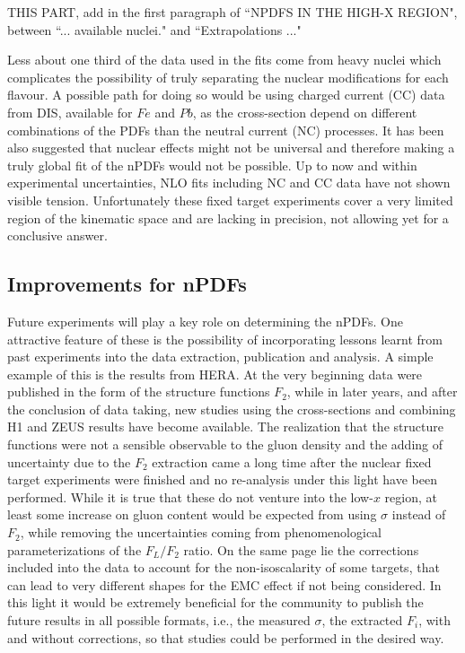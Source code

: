 \documentclass[twocolumn]{revtex4}
\begin{document}
THIS PART, add in the first paragraph of ``NPDFS IN THE HIGH-X REGION", between ``... available nuclei." and ``Extrapolations ..."

Less about one third of the data used in the fits come from heavy nuclei which complicates the possibility of truly separating the nuclear modifications for each flavour. A possible path for doing so would be using charged current (CC) data from DIS, available for $Fe$ and $Pb$, as the cross-section depend on different combinations of the PDFs than the neutral current (NC) processes. It has been also suggested that nuclear effects might not be universal and therefore making a truly global fit of the nPDFs would not be possible. Up to now and within experimental uncertainties, NLO fits including NC and CC data have not shown visible tension. Unfortunately these fixed target experiments cover a very limited region of the kinematic space and are lacking in precision, not allowing yet for a conclusive answer. 

\subsection{Improvements for nPDFs}

Future experiments will play a key role on determining the nPDFs. One attractive feature of these is the possibility of incorporating lessons learnt from past experiments into the data extraction, publication and analysis. A simple example of this is the results from HERA. At the very beginning data were published in the form of the structure functions $F_{2}$, while in later years, and after the conclusion of data taking, new studies using the cross-sections and combining H1 and ZEUS results have become available. The realization that the structure functions were not a sensible observable to the gluon density and the adding of uncertainty due to the $F_{2}$ extraction came a long time after the nuclear fixed target experiments were finished and no re-analysis under this light have been performed. While it is true that these do not venture into the low-$x$ region, at least some increase on gluon content would be expected from using $\sigma$ instead of $F_{2}$, while removing the uncertainties coming from phenomenological parameterizations of the $F_{L}/F_{2}$ ratio. On the same page lie the corrections included into the data to account for the non-isoscalarity of some targets, that can lead to very different shapes for the EMC effect if not being considered. In this light it would be extremely beneficial for the community to publish the future results in all possible formats, i.e., the measured $\sigma$, the extracted $F_{i}$, with and without corrections, so that studies could be performed in the desired way. 
\end{document}
